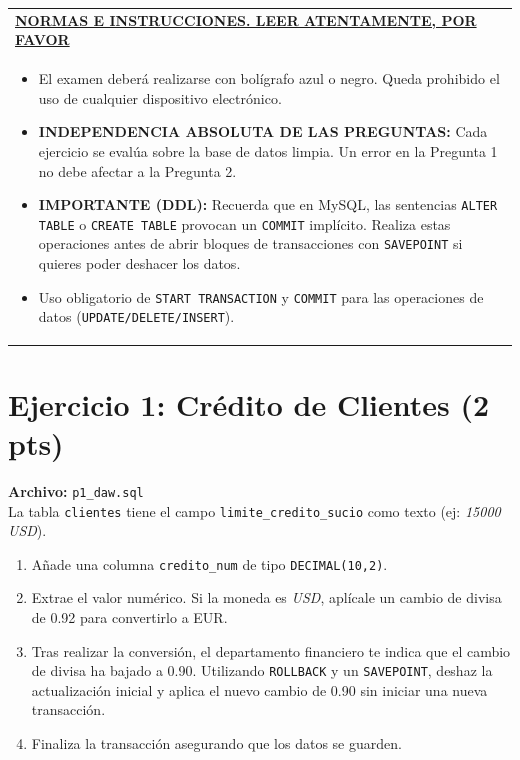 \documentclass[12pt,a4paper]{article}
\begin{document}
\vspace{0.5cm}

\noindent
\begin{tabularx}{\textwidth}{|X|}
    \hline
    \textbf{\underline{NORMAS E INSTRUCCIONES. LEER ATENTAMENTE, POR FAVOR}} \\
    \begin{itemize}[label=$\blacksquare$, leftmargin=1cm, nosep, after=\vspace{0.2cm}]
        \item El examen deberá realizarse con bolígrafo azul o negro. Queda prohibido el uso de cualquier dispositivo electrónico.
        \item \textbf{INDEPENDENCIA ABSOLUTA DE LAS PREGUNTAS:} Cada ejercicio se evalúa sobre la base de datos limpia. Un error en la Pregunta 1 no debe afectar a la Pregunta 2.
        \item \textbf{IMPORTANTE (DDL):} Recuerda que en MySQL, las sentencias \texttt{ALTER TABLE} o \texttt{CREATE TABLE} provocan un \texttt{COMMIT} implícito. Realiza estas operaciones antes de abrir bloques de transacciones con \texttt{SAVEPOINT} si quieres poder deshacer los datos.
        \item Uso obligatorio de \texttt{START TRANSACTION} y \texttt{COMMIT} para las operaciones de datos (\texttt{UPDATE/DELETE/INSERT}).
    \end{itemize} \\ \hline
\end{tabularx}

\vspace{0.5cm}

\section{Ejercicio 1: Crédito de Clientes (2 pts)}
\textbf{Archivo:} \texttt{p1\_daw.sql} \\
La tabla \texttt{clientes} tiene el campo \texttt{limite\_credito\_sucio} como texto (ej: \textit{15000 USD}).
\begin{enumerate}
    \item Añade una columna \texttt{credito\_num} de tipo \texttt{DECIMAL(10,2)}.
    \item Extrae el valor numérico. Si la moneda es \textit{USD}, aplícale un cambio de divisa de 0.92 para convertirlo a EUR.
    \item Tras realizar la conversión, el departamento financiero te indica que el cambio de divisa ha bajado a 0.90. Utilizando \texttt{ROLLBACK} y un \texttt{SAVEPOINT}, deshaz la actualización inicial y aplica el nuevo cambio de 0.90 sin iniciar una nueva transacción.
    \item Finaliza la transacción asegurando que los datos se guarden.
\end{enumerate}
\end{document}
